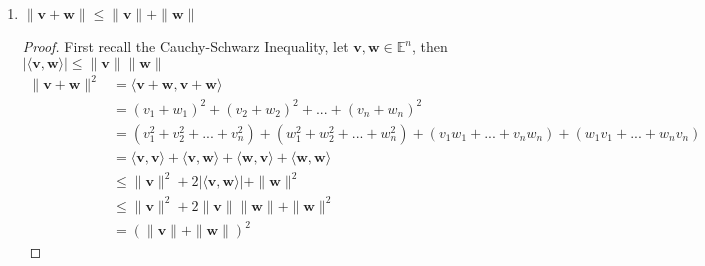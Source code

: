 \documentclass{tufte-book}
\theoremstyle{mytheoremstyle}
\theoremstyle{mylemstyle}
\theoremstyle{mydefstyle}
\begin{document}
\begin{enumerate}
\begin{proof}
\begin{align*}
\|\alpha \mathbf{v} \| &= \sqrt{\langle\alpha\mathbf{v},\alpha\mathbf{v}\rangle} \\
&= \sqrt{(\alpha^2v_1^2 +\alpha^2v_2^2 + \alpha^2v_3^2 +...+\alpha^2v_n^2)} \\
&= \sqrt{\alpha^2(v_1^2 + v_2^2 +v_3^2 +...+v_n^2)} \\
&= |\alpha| \sqrt{(v_1^2 + v_2^2 +v_3^2 +...+v_n^2)} \\
&= |\alpha| \sqrt{\langle \mathbf{v}, \mathbf{v} \rangle} \\
&= |\alpha| \|\mathbf{v}\|
\end{align*}
\end{proof}

\item $\|\mathbf{v} + \mathbf{w} \| \leq \|\mathbf{v}\| + \|\mathbf{w}\|$

\begin{proof}

First recall the Cauchy-Schwarz Inequality, let $\mathbf{v}, \mathbf{w} \in \mathbb{E}^n$, then $|\langle \mathbf{v}, \mathbf{w} \rangle| \leq \|\mathbf{v}\|\|\mathbf{w}\|$
\begin{align*}
\|\mathbf{v} + \mathbf{w} \|^2 &= \langle \mathbf{v}+\mathbf{w},\mathbf{v}+\mathbf{w}\rangle \\
&= (v_1+w_1)^2 + (v_2+w_2)^2 +...+(v_n+w_n)^2\\
&= (v_1^2 + v_2^2 +...+v_n^2) + (w_1^2+w_2^2+...+w_n^2) + (v_1w_1+...+v_nw_n) +(w_1v_1+...+w_nv_n) \\
&= \langle \mathbf{v},\mathbf{v}\rangle + \langle \mathbf{v}, \mathbf{w} \rangle + \langle \mathbf{w}, \mathbf{v} \rangle + \langle \mathbf{w},\mathbf{w}\rangle \\
&\leq \|\mathbf{v}\|^2 + 2|\langle \mathbf{v}, \mathbf{w} \rangle| + \|\mathbf{w}\|^2 \\
&\leq \|\mathbf{v}\|^2 + 2\|\mathbf{v}\|\|\mathbf{w}\| + \|\mathbf{w}\|^2 \\
&= (\|\mathbf{v}\| + \|\mathbf{w}\|)^2
\end{align*}

\end{proof}


\end{enumerate}
\end{document}
